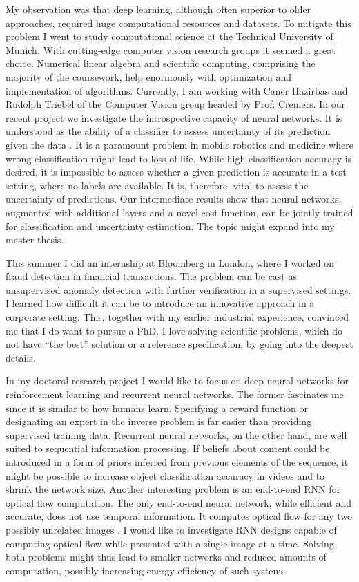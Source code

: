 \documentclass[12pt]{article}
\begin{document}
My observation was that deep learning, although often superior to older approaches, required huge computational resources and datasets. To mitigate this problem I went to study computational science at the Technical University of Munich. With cutting-edge computer vision research groups it seemed a great choice. Numerical linear algebra and scientific computing, comprising the majority of the coursework, help enormously with optimization and implementation of algorithms. Currently, I am working with Caner Hazirbas and Rudolph Triebel of the Computer Vision group headed by Prof. Cremers. In our recent project we investigate the introspective capacity of neural networks. It is understood as the ability of a classifier to assess uncertainty of its prediction given the data \cite{introspective}. It is a paramount problem in mobile robotics and medicine where wrong classification might lead to loss of life. While high classification accuracy is desired, it is impossible to assess whether a given prediction is accurate in a test setting, where no labels are available. It is, therefore, vital to assess the uncertainty of predictions. Our intermediate results show that neural networks, augmented with additional layers and a novel cost function, can be jointly trained for classification and uncertainty estimation. The topic might expand into my master thesis.

This summer I did an internship at Bloomberg in London, where I worked on fraud detection in financial transactions. The problem can be cast as unsupervised anomaly detection with further verification in a supervised settings. I learned how difficult it can be to introduce an innovative approach in a corporate setting. This, together with my earlier industrial experience, convinced me that I do want to pursue a PhD. I love solving scientific problems, which do not have ``the best'' solution or a reference specification, by going into the deepest details.

In my doctoral research project I would like to focus on deep neural networks for reinforcement learning and recurrent neural networks. The former fascinates me since it is similar to how humans learn. Specifying a reward function  or designating an expert in the inverse problem  is far easier than providing supervised training data. Recurrent neural networks, on the other hand, are well suited to sequential information processing. If beliefs about content could be introduced in a form of priors inferred from previous elements of the sequence, it might be possible to increase object classification accuracy in videos and to shrink the network size. Another interesting problem is an end-to-end RNN for optical flow computation. The only end-to-end neural network, while efficient and accurate, does not use temporal information. It computes optical flow for any two possibly unrelated images \cite{flownet}. I would like to investigate RNN designs capable of computing optical flow while presented with a single image at a time. Solving both problems might thus lead to smaller networks and reduced amounts of computation, possibly increasing energy efficiency of such systems.
\end{document}

